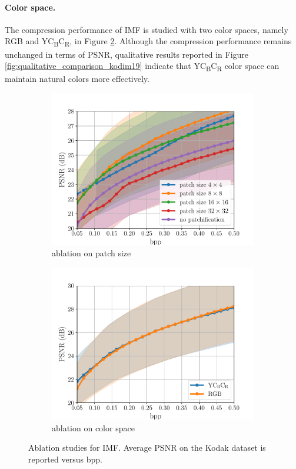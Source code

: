 \paragraph{Color space.}
The compression performance of IMF is studied with two color spaces, namely RGB and YC\textsubscript{B}C\textsubscript{R}, in Figure \ref{fig: colorspace ablation psnr-vs-bpp}.
Although the compression performance remains unchanged in terms of PSNR, qualitative results reported in Figure \ref{fig:qualitative_comparison_kodim19} indicate that YC\textsubscript{B}C\textsubscript{R} color space can maintain natural colors more effectively.

\begin{figure}[t]
	\centering
	\begin{subfigure}{.45\textwidth}
		\centering
		\includegraphics[width=.95\textwidth]{figures/ablation_patchsize_psnr.pdf}
		\caption{ablation on patch size}
		\label{fig: patch ablation psnr-vs-bpp}
	\end{subfigure}
    \begin{subfigure}{.45\textwidth}
		\centering
		\includegraphics[width=.95\textwidth]{figures/ablation_colorspace_psnr.pdf}
		\caption{ablation on color space}
		\label{fig: colorspace ablation psnr-vs-bpp}
	\end{subfigure}%
	\caption{Ablation studies for IMF. Average PSNR on the Kodak dataset is reported versus bpp. 
    }
	\label{fig: ablation studies: appen}
\end{figure}

